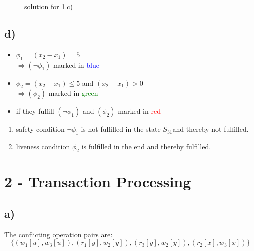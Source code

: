 \documentclass{scrartcl}
\begin{document}
\begin{figure}[!ht]
\caption{solution for 1.c)}
\end{figure}

\subsection*{d)}
\begin{itemize}
	\item $ \phi_{1} = (x_{2} - x_{1}) = 5 $\\
	$ \Rightarrow (\neg\phi_{1}) $ marked in \textcolor{blue}{blue}
	\item $ \phi_{2} = (x_{2} - x_{1}) \leq 5 $ and $ (x_{2} - x_{1}) > 0 $\\
	$ \Rightarrow (\phi_{2}) $ marked in \textcolor{green}{green}
	\item if they fulfill $ (\neg\phi_{1}) $ and $ (\phi_{2}) $ marked in \textcolor{red}{red}
\end{itemize}

\begin{enumerate}
	\item safety condition $ \neg\phi_{1} $ is not fulfilled in the state $ S_{31} $and thereby not fulfilled.
	\item liveness condition $ \phi_{2} $ is fulfilled in the end and thereby fulfilled.
\end{enumerate}
\section*{2 - Transaction Processing}
\subsection*{a)}
The conflicting operation pairs are: 
\[\{(w_1[u], w_3[u]), (r_1[y], w_2[y]), (r_3[y], w_2[y]), (r_2[x], w_3[x])\}\]
\end{document}
